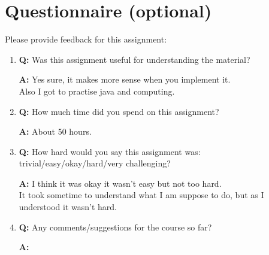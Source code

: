 \documentclass{article}
\begin{document}
 \section*{Questionnaire (optional)}
Please provide feedback for this assignment:
\begin{enumerate}
\item \textbf{Q:} Was this assignment useful for understanding the material?

      \textbf{A:} Yes sure, it makes more sense when you implement it.\\ Also I got to practise java and computing. 

\item \textbf{Q:} How much time did you spend on this assignment?

      \textbf{A:} About 50 hours.

\item \textbf{Q:} How hard would you say this assignment was: trivial/easy/okay/hard/very challenging?

      \textbf{A:} I think it was okay it wasn't easy but not too hard.\\ It took sometime to understand what I am suppose to do, but as I understood it wasn't hard.
\item \textbf{Q:} Any comments/suggestions for the course so far?

      \textbf{A:} 

\end{enumerate}
 
\end{document}
